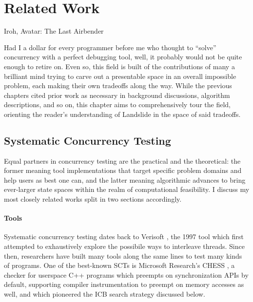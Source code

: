 \chapter{Related Work}
\label{chap:relatedwork}

{Iroh, Avatar: The Last Airbender}

Had I a dollar for every programmer before me who thought to ``solve'' concurrency with a perfect debugging tool,
well,
it probably would not be quite enough to retire on.
Even so,
this field is built of the contributions of many a brilliant mind
trying to carve out a presentable space in an overall impossible problem,
each making their own tradeoffs along the way.
While the previous chapters cited prior work as necessary in background discussions, algorithm descriptions, and so on,
this chapter aims to comprehensively tour the field,
orienting the reader's understanding of Landslide in the space of said tradeoffs.

\section{Systematic Concurrency Testing}

Equal partners in concurrency testing are the practical and the theoretical:
the former meaning tool implementations that target specific problem domains and help users as best one can,
and the latter meaning algorithmic advances to bring ever-larger state spaces within the realm of computational feasibility.
I discuss my most closely related works split in two sections accordingly.

\subsubsection{Tools}

Systematic concurrency testing dates back to Verisoft \cite{verisoft},
the 1997 tool which first attempted to exhaustively explore the possibile ways to interleave threads.
Since then, researchers have built many tools along the same lines to test many kinds of programs.
One of the best-known SCTs is Microsoft Research's CHESS \cite{chess},
a checker for userspace C++ programs which preempts on synchronization APIs by default,
supporting compiler instrumentation to preempt on memory accesses as well,
and which pioneered the ICB search strategy discussed below.

